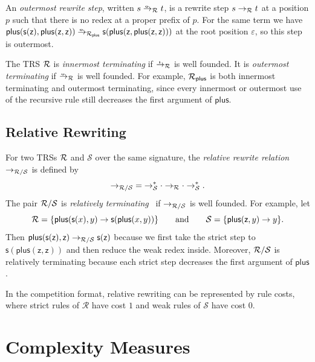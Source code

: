 An \emph{outermost rewrite step}, written $s \oto_{\Rules} t$, is a rewrite step $s \to_{\mathcal{R}} t$ at a position $p$ 
such that there is no redex at a proper prefix of $p$.
For the same term we have $\mathsf{plus}(\mathsf{s}(\mathsf{z}),\mathsf{plus}(\mathsf{z},\mathsf{z})) 
\oto_{\Rules_{\mathsf{plus}}} \mathsf{s}(\mathsf{plus}(\mathsf{z},\mathsf{plus}(\mathsf{z},\mathsf{z})))$
at the root position $\varepsilon$, so this step is outermost.

The TRS $\mathcal{R}$ is \emph{innermost terminating} if $\ito_\Rules$ is well founded.
It is \emph{outermost terminating} if $\oto_\Rules$ is well founded.
For example, $\mathcal{R}_{\mathsf{plus}}$ is both innermost terminating and outermost terminating, 
since every innermost or outermost use of the recursive rule still decreases the first argument of $\mathsf{plus}$.

\subsection{Relative Rewriting}

For two TRSs $\mathcal{R}$ and $\mathcal{S}$ over the same signature, 
the \emph{relative rewrite relation} $\to_{\mathcal{R}/\mathcal{S}}$ is defined by
\[
  \to_{\mathcal{R}/\mathcal{S}} \;=\; \to_{\mathcal{S}}^* \cdot \to_{\mathcal{R}} \cdot \to_{\mathcal{S}}^* .
\]
The pair $\mathcal{R}/\mathcal{S}$ is \emph{relatively terminating}~\cite{geser1990RelativeTermination} if $\to_{\mathcal{R}/\mathcal{S}}$ is well founded.
For example, let
\[
  \mathcal{R} = \{\mathsf{plus}(\mathsf{s}(x), y) \to \mathsf{s}(\mathsf{plus}(x,y))\}
  \qquad \text{and} \qquad
  \mathcal{S} = \{\mathsf{plus}(\mathsf{z}, y) \to y\}.
\]
Then $\mathsf{plus}(\mathsf{s}(\mathsf{z}),\mathsf{z}) \to_{\mathcal{R}/\mathcal{S}} \mathsf{s}(\mathsf{z})$
because we first take the strict step to $\mathsf{s}(\mathsf{plus}(\mathsf{z},\mathsf{z}))$ 
and then reduce the weak redex inside. 
Moreover, $\mathcal{R}/\mathcal{S}$ is relatively terminating because each strict step decreases the first argument of $\mathsf{plus}$.

In the competition format, relative rewriting can be represented by rule costs, 
where strict rules of $\mathcal{R}$ have cost $1$ and weak rules of $\mathcal{S}$ have cost $0$.

\section{Complexity Measures}

